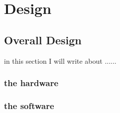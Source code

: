 \chapter{Design}
\label{chap:design}
\section{Overall Design}
in this section I will write about ......
\subsection{the hardware}
\subsection{the software}
